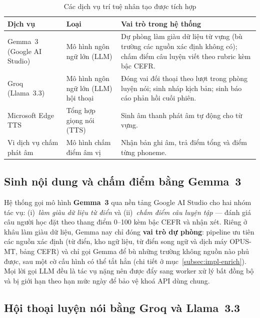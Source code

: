 \begin{table}[h]
  \centering
  \small
  \renewcommand{\arraystretch}{1.3}
  \begin{tabular}{|p{3.6cm}|p{4.0cm}|p{6.8cm}|}
    \hline
    \textbf{Dịch vụ} & \textbf{Loại} & \textbf{Vai trò trong hệ thống} \\
    \hline
    Gemma~3 (Google AI Studio) & Mô hình ngôn ngữ lớn (LLM) & Dự phòng làm giàu dữ liệu từ vựng (bù trường các nguồn xác định không có); chấm điểm câu luyện viết theo rubric kèm bậc CEFR. \\
    \hline
    Groq (Llama~3.3) & Mô hình ngôn ngữ lớn (LLM) hội thoại & Đóng vai đối thoại theo lượt trong phòng luyện nói; sinh nháp kịch bản; sinh báo cáo phản hồi cuối phiên. \\
    \hline
    Microsoft Edge TTS & Tổng hợp giọng nói (TTS) & Sinh âm thanh phát âm tự động cho từ vựng. \\
    \hline
    Vi dịch vụ chấm phát âm & Mô hình chấm điểm âm vị & Nhận bản ghi âm, trả điểm tổng và điểm từng phoneme. \\
    \hline
  \end{tabular}
  \caption{Các dịch vụ trí tuệ nhân tạo được tích hợp}
  \label{tab:ai-services}
\end{table}

\subsection{Sinh nội dung và chấm điểm bằng Gemma~3}
\label{subsec:gemma}

Hệ thống gọi mô hình \textbf{Gemma~3} qua nền tảng Google AI Studio
\cite{gemma2025technical} cho hai nhóm tác vụ: (i)~\textit{làm giàu dữ liệu
từ điển} và (ii)~\textit{chấm điểm câu luyện tập} --- đánh giá câu người học
đặt theo thang điểm 0--100 kèm bậc CEFR và nhận xét. Riêng ở khâu làm giàu dữ
liệu, Gemma nay chỉ đóng \textbf{vai trò dự phòng}: pipeline ưu tiên các nguồn
xác định (từ điển, kho ngữ liệu, từ điển song ngữ và dịch máy OPUS-MT, bảng
CEFR) và chỉ gọi Gemma để bù những trường không nguồn nào phủ được, sau một cờ
cấu hình có thể tắt hẳn (chi tiết ở mục~\ref{subsec:impl-enrich}). Mọi lời gọi
LLM đều là tác vụ nặng nên được đẩy sang worker xử lý bất đồng bộ và bị giới
hạn theo hạn mức ngày để bảo vệ khoá API dùng chung.

\subsection{Hội thoại luyện nói bằng Groq và Llama~3.3}
\label{subsec:groq}


